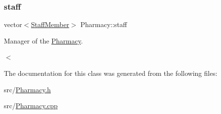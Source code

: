 \mbox{\label{classPharmacy_a5b515f5ef98dc2babdc48b8c937688a9}} 
\subsubsection{\texorpdfstring{staff}{staff}}
{\footnotesize\ttfamily vector$<$\hyperlink{classStaffMember}{Staff\+Member}$>$ Pharmacy\+::staff\hspace{0.3cm}{\ttfamily [private]}}



Manager of the \hyperlink{classPharmacy}{Pharmacy}. 

$<$ 

The documentation for this class was generated from the following files\+:\begin{DoxyCompactItemize}
\item 
src/\hyperlink{Pharmacy_8h}{Pharmacy.\+h}\item 
src/\hyperlink{Pharmacy_8cpp}{Pharmacy.\+cpp}\end{DoxyCompactItemize}
